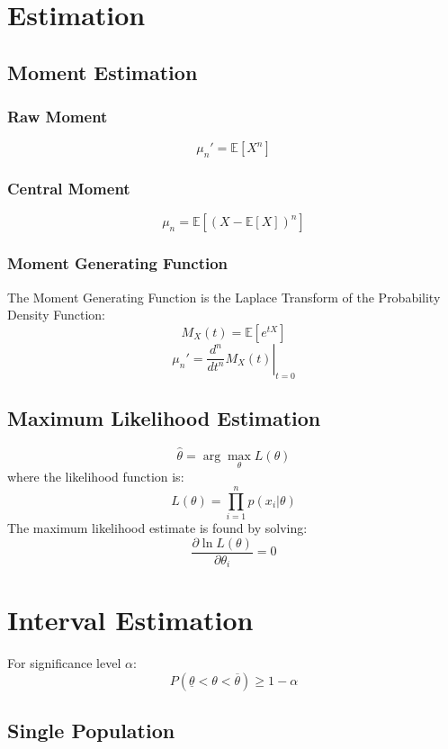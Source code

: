 \documentclass{article}
\begin{document}
\newpage
\section{Estimation}

\subsection{Moment Estimation}

\subsubsection{Raw Moment}
\[
    \mu_n' = \mathbb{E}[X^n]
\]

\subsubsection{Central Moment}
\[
    \mu_n = \mathbb{E}[(X - \mathbb{E}[X])^n]
\]

\subsubsection{Moment Generating Function}
The Moment Generating Function is the Laplace Transform of the Probability Density Function:
\[
    M_X(t) = \mathbb{E}[e^{tX}]
\]
\[
    \mu_n' = \left.\frac{d^n}{dt^n} M_X(t)\right|_{t=0}
\]

\subsection{Maximum Likelihood Estimation}
\[
    \hat{\theta} = \arg\max_\theta L(\theta)
\]
where the likelihood function is:
\[
    L(\theta) = \prod_{i=1}^{n} p(x_i|\theta)
\]
The maximum likelihood estimate is found by solving:
\[
    \frac{\partial \ln L(\theta)}{\partial \theta_i} = 0
\]


\newpage
\section{Interval Estimation}

For significance level $\alpha$:
\[
    P(\underline{\theta} < \theta < \overline{\theta}) \geq 1 - \alpha
\]

\subsection{Single Population}
\end{document}
